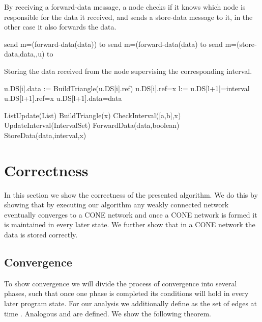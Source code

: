 \documentclass[11pt]{article}
\begin{document}
\begin{algorithm}
By receiving a forward-data message, a node checks if it knows which node is responsible for the data it received, and sends a store-data message to it, in the other case it also forwards the data.

\begin{algorithmic}
\If {}
\If {}
\State send m=(forward-data(data)) to 
\Else
\State send m=(forward-data(data) to
\State 
\EndIf
\Else
\State send m=(store-data,data,,u) to 
\EndIf
\EndFunction
\end{algorithmic}
\end{algorithm}
\begin{algorithm}
Storing the data received from the node supervising the corresponding interval.

\begin{algorithmic}
\If{}
\State u.DS[i].data := 
\State BuildTriangle(u.DS[i].ref)
\State u.DS[i].ref=x
\Else
\State l:=
\State u.DS[l+1]=interval
\State u.DS[l+1].ref=x
\State u.DS[l+1].data=data
\EndIf
\EndFunction
\end{algorithmic}
\end{algorithm}


\begin{algorithm}
\begin{algorithmic}
\State  {}
\State ListUpdate(List)
\State BuildTriangle(x)
\State CheckInterval([a,b],x)
\State UpdateInterval(IntervalSet)
\State ForwardData(data,boolean)
\State StoreData(data,interval,x)
\EndIf

\end{algorithmic}
\end{algorithm}
\section{Correctness}
In this section we show the correctness of the presented algorithm. We do this by showing that by executing our algorithm any weakly connected network eventually converges to a CONE network and once a CONE network is formed it is maintained in every later state. We further show that in a CONE network the data is stored correctly.

\subsection{Convergence}
To show convergence we will divide the process of convergence into several phases, such that once one phase is completed its conditions will hold in every later program state. For our analysis we additionally define  as the set of edges at time . Analogous  and  are defined.
We show the following theorem. 
\end{document}

